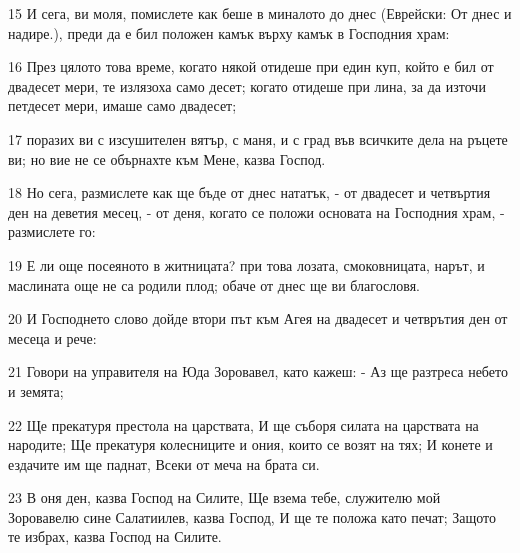 \par 15 И сега, ви моля, помислете как беше в миналото до днес (Еврейски: От днес и надире.), преди да е бил положен камък върху камък в Господния храм:
\par 16 През цялото това време, когато някой отидеше при един куп, който е бил от двадесет мери, те излязоха само десет; когато отидеше при лина, за  да източи петдесет мери, имаше само двадесет;
\par 17 поразих ви с изсушителен вятър, с маня, и с град във всичките дела на ръцете ви; но вие не се обърнахте към Мене, казва Господ.
\par 18 Но сега, размислете как ще бъде от днес нататък, - от двадесет и четвъртия ден на деветия месец, - от деня, когато се положи основата на Господния храм, - размислете го:
\par 19 Е ли още посеяното в житницата? при това лозата, смоковницата, нарът, и маслината още не са родили плод; обаче от днес ще ви благословя.
\par 20 И Господнето слово дойде втори път към Агея на двадесет и четврътия ден от месеца и рече:
\par 21 Говори на управителя на Юда Зоровавел, като кажеш: - Аз ще разтреса небето и земята;
\par 22 Ще прекатуря престола на царствата, И ще съборя силата на царствата на народите; Ще прекатуря колесниците и ония, които се возят на тях; И конете и ездачите им ще паднат, Всеки от меча на брата си.
\par 23 В оня ден, казва Господ на Силите, Ще взема тебе, служителю мой Зоровавелю сине Салатиилев, казва Господ, И ще те положа като печат; Защото те избрах, казва Господ на Силите.

